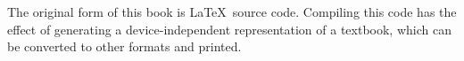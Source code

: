 \documentclass[11pt]{book}
\newcommand{\thisgls}{temp}  %
\begin{document}
The original form of this book is \LaTeX\ source code.  Compiling this
code has the effect of generating a device-independent representation
of a textbook, which can be converted to other formats and printed.


\setcounter{tocdepth}{1}
\tableofcontents

\mainmatter
\renewcommand{\thisgls}{dataacq}


\printglossary[type=\thisgls]
\glsresetall

\renewcommand{\thisgls}{measure}


\printglossary[type=\thisgls]
\glsresetall

\renewcommand{\thisgls}{model1}


\printglossary[type=\thisgls]
\glsresetall

\renewcommand{\thisgls}{compare}


\printglossary[type=\thisgls]
\glsresetall

%
%






\end{document}
